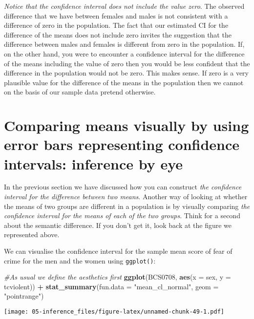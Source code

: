 \documentclass[
]{book}
\newenvironment{Shaded}{\begin{snugshade}}{\end{snugshade}}
\newcommand{\AttributeTok}[1]{\textcolor[rgb]{0.13,0.29,0.53}{#1}}
\newcommand{\CommentTok}[1]{\textcolor[rgb]{0.56,0.35,0.01}{\textit{#1}}}
\newcommand{\FunctionTok}[1]{\textcolor[rgb]{0.13,0.29,0.53}{\textbf{#1}}}
\newcommand{\NormalTok}[1]{#1}
\newcommand{\SpecialCharTok}[1]{\textcolor[rgb]{0.81,0.36,0.00}{\textbf{#1}}}
\newcommand{\StringTok}[1]{\textcolor[rgb]{0.31,0.60,0.02}{#1}}
\begin{document}
\emph{Notice that the confidence interval does not include the value zero}. The observed difference that we have between females and males is not consistent with a difference of zero in the population. The fact that our estimated CI for the difference of the means does not include zero invites the suggestion that the difference between males and females is different from zero in the population. If, on the other hand, you were to encounter a confidence interval for the difference of the means including the value of zero then you would be less confident that the difference in the population would not be zero. This makes sense. If zero is a very plausible value for the difference of the means in the population then we cannot on the basis of our sample data pretend otherwise.

\section{Comparing means visually by using error bars representing confidence intervals: inference by eye}\label{comparing-means-visually-by-using-error-bars-representing-confidence-intervals-inference-by-eye}

In the previous section we have discussed how you can construct \emph{the confidence interval for the difference between two means}. Another way of looking at whether the means of two groups are different in a population is by visually comparing \emph{the confidence interval for the means of each of the two groups}. Think for a second about the semantic difference. If you don't get it, look back at the figure we represented above.

We can visualise the confidence interval for the sample mean score of fear of crime for the men and the women using \texttt{ggplot()}:

\begin{Shaded}
\begin{Highlighting}[]
\CommentTok{\#As usual we define the aesthetics first}
\FunctionTok{ggplot}\NormalTok{(BCS0708, }\FunctionTok{aes}\NormalTok{(}\AttributeTok{x =}\NormalTok{ sex, }\AttributeTok{y =}\NormalTok{ tcviolent)) }\SpecialCharTok{+}
        \FunctionTok{stat\_summary}\NormalTok{(}\AttributeTok{fun.data =} \StringTok{"mean\_cl\_normal"}\NormalTok{, }\AttributeTok{geom =} \StringTok{"pointrange"}\NormalTok{) }
\end{Highlighting}
\end{Shaded}

\texttt{[image: 05-inference\_files/figure-latex/unnamed-chunk-49-1.pdf]}
\end{document}
